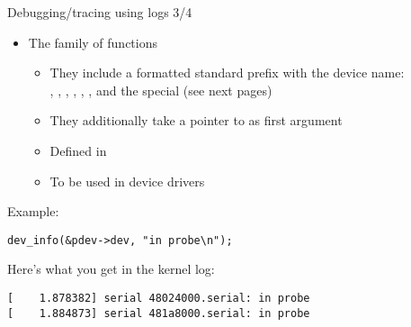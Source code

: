 \begin{frame}[fragile]{Debugging/tracing using logs 3/4}
  \begin{itemize}
  \item The  family of functions
    \begin{itemize}
    \item They include a formatted standard prefix with the device
      name:\\ , , ,
      , , , 
      and the special  (see next pages)
    \item They additionally take a pointer to  as first
      argument
    \item Defined in 
    \item To be used in device drivers
    \end{itemize}
  \end{itemize}
  Example:
  \begin{verbatim}
dev_info(&pdev->dev, "in probe\n");
  \end{verbatim}
  Here's what you get in the kernel log:
\begin{verbatim}
[    1.878382] serial 48024000.serial: in probe
[    1.884873] serial 481a8000.serial: in probe
\end{verbatim}
\end{frame}

